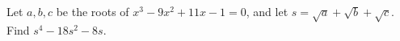 Let $a,b,c$ be the roots of $x^3-9x^2+11x-1=0$, and let $s=\sqrt{a}+\sqrt{b}+\sqrt{c}$. Find $s^4-18s^2-8s$.